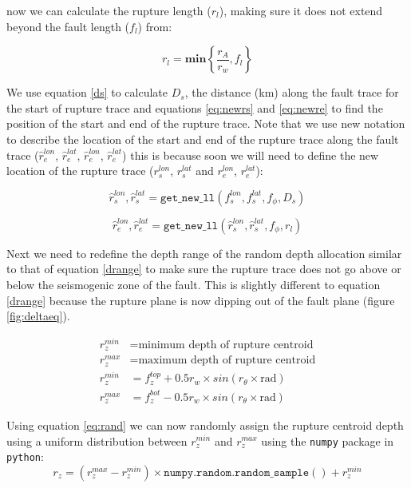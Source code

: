 now we can calculate the rupture length ($r_l$), making sure it does not extend beyond the fault length ($f_l$) from:

\begin{equation}
r_l = \mathbf{min}\left\{\frac{r_A}{r_w}, f_l\right\}
\end{equation}

We use equation \ref{ds} to calculate $D_s$, the distance (km) along the fault trace for the start of rupture trace and equations \ref{eq:newrs} and \ref{eq:newre} to find the position of the start and end of the rupture trace. Note that we use new notation to describe the location of the start and end of the rupture trace along the fault trace ($\hat{r}_e^{lon}$, $\hat{r}_e^{lat}$, $\hat{r}_e^{lon}$, $\hat{r}_e^{lat}$) this is because soon we will need to define the new location of the rupture trace ($r_s^{lon}$, $r_s^{lat}$ and $r_e^{lon}$, $r_e^{lat}$):

\begin{equation}\label{eq:newrs2}
\hat{r}_s^{lon},\hat{r}_s^{lat} =\mathtt{get\_new\_ll}(f_s^{lon}, f_s^{lat}, f_\phi, D_s)
\end{equation}

\begin{equation}\label{eq:newre2}
\hat{r}_e^{lon}, \hat{r}_e^{lat} =\mathtt{get\_new\_ll}(\hat{r}_s^{lon}, \hat{r}_s^{lat}, f_\phi, r_l)
\end{equation}

Next we need to redefine the depth range of the random depth allocation similar to that of equation \ref{drange} to make sure the rupture trace does not go above or below the seismogenic zone of the fault. This is slightly different to equation \ref{drange} because the rupture plane is now dipping out of the fault plane (figure \ref{fig:deltaeq}).

\begin{subequations} \label{drange2}
\begin{align}
r_z^{min} & = \mbox{minimum depth of rupture centroid}  \\
r_z^{max} & = \mbox{maximum depth of rupture centroid}  \\
r_z^{min} & = f_z^{top} + 0.5r_w  \times sin(r_\theta  \times \mbox{rad})    \\
r_z^{max} & = f_z^{bot} - 0.5r_w  \times sin(r_\theta  \times \mbox{rad})  
\end{align}
\end{subequations}

Using equation \ref{eq:rand} we can now randomly assign the rupture centroid depth using a uniform distribution between $r_z^{min}$ and $r_z^{max}$ using the \texttt{numpy} package in \texttt{python}:
\begin{equation}
r_z = ( r_z^{max}-r_z^{min} ) \times  \mathtt{numpy.random.random\_sample()} +   r_z^{min}
\end{equation}

